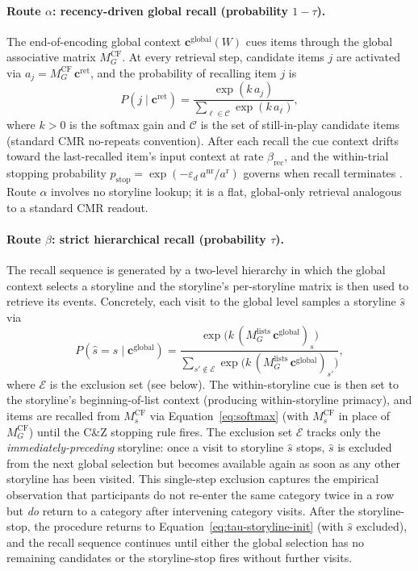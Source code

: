 \documentclass[10pt]{article}
\newcommand{\cglob}{\mathbf{c}^{\mathrm{global}}}
\newcommand{\cret}{\mathbf{c}^{\mathrm{ret}}}
\newcommand{\MCFG}{M^{\mathrm{CF}}_{G}}
\newcommand{\MCFs}{M^{\mathrm{CF}}_{s}}
\newcommand{\MlistsG}{M^{\mathrm{lists}}_{G}}
\newcommand{\betarec}{\beta_{\mathrm{rec}}}
\newcommand{\epsd}{\varepsilon_{d}}
\newcommand{\tauinit}{\tau}
\begin{document}
\paragraph{Route $\alpha$: recency-driven global recall (probability $1-\tauinit$).}
The end-of-encoding global context $\cglob(W)$ cues items through the
global associative matrix $\MCFG$. At every retrieval step, candidate
items $j$ are activated via $a_j = \MCFG\,\cret$, and the probability
of recalling item $j$ is
\begin{equation}
  P(j \mid \cret) = \frac{\exp(k\,a_j)}{\sum_{\ell \in \mathcal{C}} \exp(k\,a_{\ell})},
  \label{eq:softmax}
\end{equation}
where $k > 0$ is the softmax gain and $\mathcal{C}$ is the set of
still-in-play candidate items (standard CMR no-repeats convention).
After each recall the cue context drifts toward the last-recalled
item's input context at rate $\betarec$, and the within-trial stopping
probability $p_{\mathrm{stop}} = \exp(-\epsd\,a^{\mathrm{nr}}/a^{\mathrm{r}})$
governs when recall terminates \citep[C\&Z 2025 Eqs.\ 3, 7]{CornellZhang2025}.
Route $\alpha$ involves no storyline lookup; it is a flat,
global-only retrieval analogous to a standard CMR readout.

\paragraph{Route $\beta$: strict hierarchical recall (probability $\tauinit$).}
The recall sequence is generated by a two-level hierarchy in which the
global context selects a storyline and the storyline's per-storyline
matrix is then used to retrieve its events. Concretely, each visit to
the global level samples a storyline $\hat{s}$ via
\begin{equation}
  P(\hat{s} = s \mid \cglob) = \frac{\exp\bigl(k\,(\MlistsG\,\cglob)_{s}\bigr)}{\sum_{s' \notin \mathcal{E}} \exp\bigl(k\,(\MlistsG\,\cglob)_{s'}\bigr)},
  \label{eq:tau-storyline-init}
\end{equation}
where $\mathcal{E}$ is the exclusion set (see below). The
within-storyline cue is then set to the storyline's beginning-of-list
context (producing within-storyline primacy), and items are recalled
from $\MCFs$ via Equation~\ref{eq:softmax} (with $\MCFs$ in place of
$\MCFG$) until the C\&Z stopping rule fires. The exclusion set
$\mathcal{E}$ tracks only the \emph{immediately-preceding} storyline:
once a visit to storyline $\hat{s}$ stops, $\hat{s}$ is excluded from
the next global selection but becomes available again as soon as any
other storyline has been visited. This single-step exclusion captures
the empirical observation that participants do not re-enter the same
category twice in a row but \emph{do} return to a category after
intervening category visits. After the storyline-stop, the procedure
returns to Equation~\ref{eq:tau-storyline-init} (with $\hat{s}$
excluded), and the recall sequence continues until either the global
selection has no remaining candidates or the storyline-stop fires
without further visits.
\end{document}
